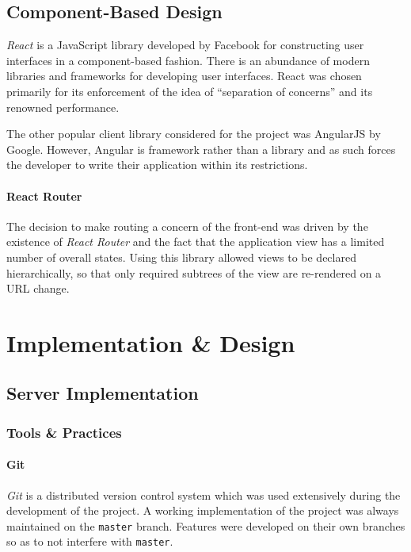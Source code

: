 \documentclass{l4proj}
\newcommand{\code}[1]{\texttt{#1}}
\begin{document}
    \section{Component-Based Design}

        \textit{React} is a JavaScript library developed by Facebook for constructing user interfaces in a component-based fashion. There is an abundance of modern libraries and frameworks for developing user interfaces. React was chosen primarily for its enforcement of the idea of ``separation of concerns'' and its renowned performance.
        
        The other popular client library considered for the project was AngularJS by Google. However, Angular is framework rather than a library and as such forces the developer to write their application within its restrictions.

        \subsubsection{React Router}
        The decision to make routing a concern of the front-end was driven by the existence of \textit{React Router} and the fact that the application view has a limited number of overall states. Using this library allowed views to be declared hierarchically, so that only required subtrees of the view are re-rendered on a URL change.
        
        





\chapter{Implementation \& Design}
                    

\section{Server Implementation}

    \subsection{Tools \& Practices}
    
             \subsubsection{Git}
         \textit{Git} is a distributed version control system which was used extensively during the development of the project. A working implementation of the project was always maintained on the \code{master} branch. Features were developed on their own branches so as to not interfere with \code{master}.
         
\end{document}
